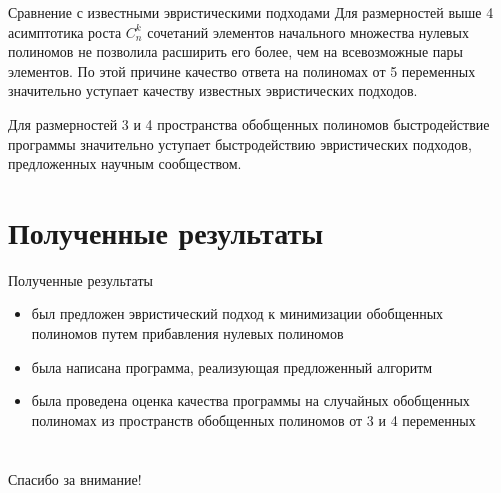\documentclass{beamer}
\begin{document}
\begin{frame}{Сравнение с известными эвристическими подходами}
Для размерностей выше 4 асимптотика роста $ C_n^k $ сочетаний элементов начального множества нулевых полиномов не позволила расширить его более, чем на всевозможные пары элементов. По этой причине качество ответа на полиномах от 5 переменных значительно уступает качеству известных эвристических подходов.

Для размерностей 3 и 4 пространства обобщенных полиномов быстродействие программы значительно уступает быстродействию эвристических подходов, предложенных научным сообществом.
\end{frame}

\section[Результаты]{Полученные результаты}
\begin{frame}{Полученные результаты}

\begin{itemize}
    \item был предложен эвристический подход к минимизации обобщенных полиномов путем прибавления нулевых полиномов
    \item была написана программа, реализующая предложенный алгоритм
    \item была проведена оценка качества программы на случайных обобщенных полиномах из пространств обобщенных полиномов от 3 и 4 переменных
\end{itemize}

\end{frame}

\section{}
\begin{frame}
\centering \huge{Спасибо за внимание!}
\end{frame}
\end{document}
